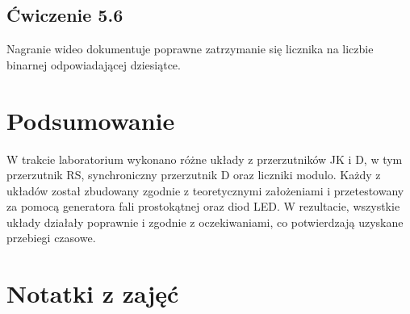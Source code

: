 \documentclass{article}
\begin{document}
    \subsection{Ćwiczenie 5.6}
      Nagranie wideo dokumentuje poprawne zatrzymanie się licznika na liczbie binarnej odpowiadającej dziesiątce.
  \section{Podsumowanie}
    W trakcie laboratorium wykonano różne układy z przerzutników JK i D, w tym przerzutnik RS, synchroniczny przerzutnik D oraz liczniki modulo. Każdy z układów został zbudowany zgodnie z teoretycznymi założeniami i przetestowany za pomocą generatora fali prostokątnej oraz diod LED. W rezultacie, wszystkie układy działały poprawnie i zgodnie z oczekiwaniami, co potwierdzają uzyskane przebiegi czasowe.
  \section{Notatki z zajęć}
\end{document}
